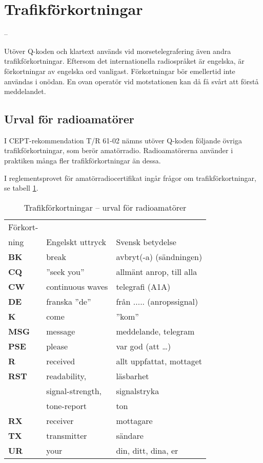 \section{Trafikförkortningar}
\label{trafikförkortningar}
 --

Utöver Q-koden och klartext används vid morsetelegrafering även andra
trafikförkortningar.
Eftersom det internationella radiospråket är engelska, är förkortningar av
engelska ord vanligast.
Förkortningar bör emellertid inte användas i onödan.
En ovan operatör vid motstationen kan då få svårt att förstå meddelandet.

\subsection{Urval för radioamatörer}

I CEPT-rekommendation T/R 61-02 nämns utöver Q-koden följande övriga
trafikförkortningar, som berör amatörradio.
Radioamatörerna använder i praktiken många fler trafikförkortningar än dessa.

I reglementsprovet för amatörradiocertifikat ingår frågor om
trafikförkortningar, se tabell \ref{tab:trafikforkortningar}.

\begin{table}
  \begin{tabular}{lll}
    Förkort- & & \\
    ning & Engelskt uttryck & Svensk betydelse \\
    \hline
    \textbf{BK} & break & avbryt(-a) (sändningen) \\
    \textbf{CQ} & ''seek you'' & allmänt anrop, till alla \\
    \textbf{CW} & continuous waves & telegrafi (A1A) \\
    \textbf{DE} & franska ''de'' & från ..... (anropssignal) \\
    \textbf{K}  & come & ''kom'' \\
    \textbf{MSG} & message & meddelande, telegram \\
    \textbf{PSE} & please & var god (att \dots) \\
    \textbf{R} & received & allt uppfattat, mottaget \\
    \textbf{RST} & readability, & läsbarhet \\
   & signal-strength, & signalstryka \\
   & tone-report & ton \\
    \textbf{RX} & receiver & mottagare \\
    \textbf{TX} & transmitter & sändare \\
    \textbf{UR} & your & din, ditt, dina, er \\
  \end{tabular}
\caption{Trafikförkortningar -- urval för radioamatörer}
\label{tab:trafikforkortningar}
\end{table}


